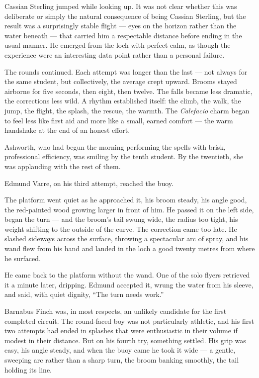 Cassian Sterling jumped while looking up. It was not clear whether this was deliberate or simply the natural consequence of being Cassian Sterling, but the result was a surprisingly stable flight --- eyes on the horizon rather than the water beneath --- that carried him a respectable distance before ending in the usual manner. He emerged from the loch with perfect calm, as though the experience were an interesting data point rather than a personal failure.
 
The rounds continued. Each attempt was longer than the last --- not always for the same student, but collectively, the average crept upward. Brooms stayed airborne for five seconds, then eight, then twelve. The falls became less dramatic, the corrections less wild. A rhythm established itself: the climb, the walk, the jump, the flight, the splash, the rescue, the warmth. The \textit{Calefacio} charm began to feel less like first aid and more like a small, earned comfort --- the warm handshake at the end of an honest effort.
 
Ashworth, who had begun the morning performing the spells with brisk, professional efficiency, was smiling by the tenth student. By the twentieth, she was applauding with the rest of them.
 
Edmund Varre, on his third attempt, reached the buoy.
 
The platform went quiet as he approached it, his broom steady, his angle good, the red-painted wood growing larger in front of him. He passed it on the left side, began the turn --- and the broom's tail swung wide, the radius too tight, his weight shifting to the outside of the curve. The correction came too late. He slashed sideways across the surface, throwing a spectacular arc of spray, and his wand flew from his hand and landed in the loch a good twenty metres from where he surfaced.
 
He came back to the platform without the wand. One of the solo flyers retrieved it a minute later, dripping. Edmund accepted it, wrung the water from his sleeve, and said, with quiet dignity, \enquote{The turn needs work.}
 
Barnabus Finch was, in most respects, an unlikely candidate for the first completed circuit. The round-faced boy was not particularly athletic, and his first two attempts had ended in splashes that were enthusiastic in their volume if modest in their distance. But on his fourth try, something settled. His grip was easy, his angle steady, and when the buoy came he took it wide --- a gentle, sweeping arc rather than a sharp turn, the broom banking smoothly, the tail holding its line.
 
